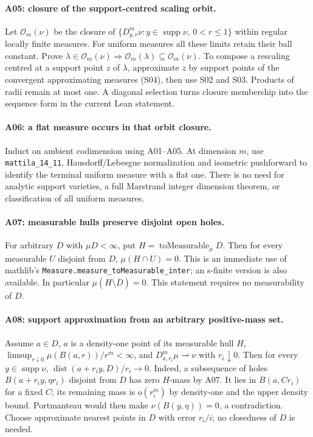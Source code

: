 \paragraph{A05: closure of the support-centred scaling orbit.}
Let $\mathcal O_m(\nu)$ be the closure of
$\{D^m_{y,r}\nu:y\in\operatorname{supp}\nu,\ 0<r\leq1\}$ within regular
locally finite measures. For uniform measures all these limits retain their
ball constant. Prove
$\lambda\in\mathcal O_m(\nu)\Rightarrow
 \mathcal O_m(\lambda)\subseteq\mathcal O_m(\nu)$.
To compose a rescaling centred at a support point $z$ of $\lambda$, approximate
$z$ by support points of the convergent approximating measures (S04), then use
S02 and S03. Products of radii remain at most one. A diagonal selection turns
closure membership into the sequence form in the current Lean statement.

\paragraph{A06: a flat measure occurs in that orbit closure.}
Induct on ambient codimension using A01--A05. At dimension $m$, use
\texttt{mattila\_14\_11}, Hausdorff/Lebesgue normalization and isometric
pushforward to identify the terminal uniform measure with a flat one.
There is no need for analytic support varieties, a full Marstrand integer
dimension theorem, or classification of all uniform measures.

\paragraph{A07: measurable hulls preserve disjoint open holes.}
For arbitrary $D$ with $\mu D<\infty$, put $H=\operatorname{toMeasurable}_\mu D$.
Then for every measurable $U$ disjoint from $D$, $\mu(H\cap U)=0$.
This is an immediate use of mathlib's
\texttt{Measure.measure\_toMeasurable\_inter}; an s-finite version is also
available. In particular $\mu(H\setminus\overline D)=0$.
This statement requires no measurability of $D$.

\paragraph{A08: support approximation from an arbitrary positive-mass set.}
Assume $a\in D$, $a$ is a density-one point of its measurable hull $H$,
$\limsup_{r\downarrow0}\mu(B(a,r))/r^m<\infty$, and
$D^m_{a,r_i}\mu\rightharpoonup\nu$ with $r_i\downarrow0$.
Then for every $y\in\operatorname{supp}\nu$,
$\operatorname{dist}(a+r_i y,D)/r_i\to0$.
Indeed, a subsequence of holes $B(a+r_i y,\eta r_i)$ disjoint from $D$ has
zero $H$-mass by A07. It lies in $B(a,Cr_i)$ for a fixed $C$; its remaining
mass is $o(r_i^m)$ by density-one and the upper density bound. Portmanteau
would then make $\nu(B(y,\eta))=0$, a contradiction. Choose approximate
nearest points in $D$ with error $r_i/i$; no closedness of $D$ is needed.

